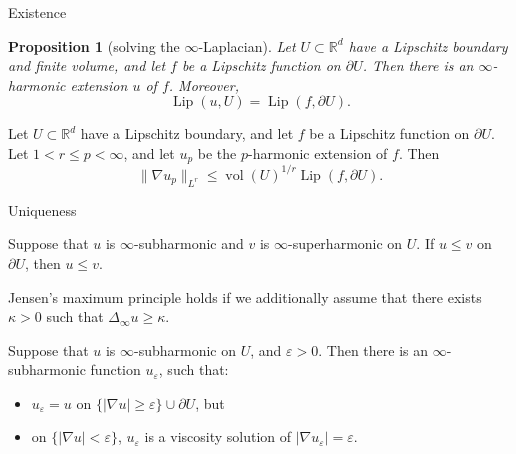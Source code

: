 \documentclass[10pt]{beamer}
\newcommand{\RR}{\mathbb{R}}
\DeclareMathOperator{\Lip}{Lip}
\newtheorem{proposition}{Proposition}
\begin{document}
\begin{frame}{Existence} 
\begin{proposition}[solving the $\infty$-Laplacian]
Let $U \subset \RR^d$ have a Lipschitz boundary and finite volume, and let $f$ be a Lipschitz function on $\partial U$.
Then there is an $\infty$-harmonic extension $u$ of $f$. Moreover,
$$\Lip(u, U) = \Lip(f, \partial U).$$
\end{proposition}

\begin{lemma}
Let $U \subset \RR^d$ have a Lipschitz boundary, and let $f$ be a Lipschitz function on $\partial U$.
Let $1 < r \leq p < \infty$, and let $u_p$ be the $p$-harmonic extension of $f$. Then
$$\|\nabla u_p\|_{L^r} \leq \operatorname{vol}(U)^{1/r} \Lip(f, \partial U) .$$
\end{lemma}
\end{frame}

\begin{frame}{Uniqueness}
\begin{theorem}
Suppose that $u$ is $\infty$-subharmonic and $v$ is $\infty$-superharmonic on $U$.
If $u \leq v$ on $\partial U$, then $u \leq v$.
\end{theorem}

\begin{lemma}
Jensen's maximum principle holds if we additionally assume that there exists $\kappa > 0$ such that $\Delta_\infty u \geq \kappa$.
\end{lemma}

\begin{lemma}
Suppose that $u$ is $\infty$-subharmonic on $U$, and $\varepsilon > 0$.
Then there is an $\infty$-subharmonic function $u_\varepsilon$, such that: 
\begin{itemize}
\item $u_\varepsilon = u$ on $\{|\nabla u| \geq \varepsilon\} \cup \partial U$, but  
\item on $\{|\nabla u| < \varepsilon\}$, $u_\varepsilon$ is a viscosity solution of $|\nabla u_\varepsilon| = \varepsilon$.
\end{itemize}
\end{lemma}
\end{frame}
\end{document}
